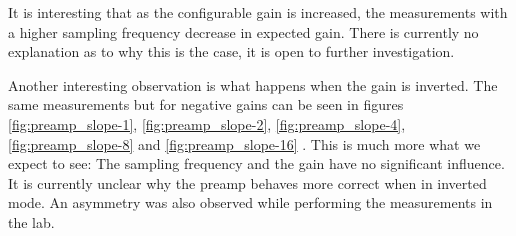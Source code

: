 It is interesting that as the configurable gain is increased, the measurements
with a higher sampling frequency decrease in expected gain. There is currently
no  explanation  as  to  why  this  is  the  case,  it   is  open  to  further
investigation.

Another interesting observation is what happens when the gain is inverted. The
same  measurements  but  for   negative   gains   can   be   seen  in  figures
\ref{fig:preamp_slope-1}, \ref{fig:preamp_slope-2},  \ref{fig:preamp_slope-4},
\ref{fig:preamp_slope-8} and  \ref{fig:preamp_slope-16}  .  This  is much more
what we expect to see: The sampling frequency and the gain have no significant
influence. It is currently unclear why the preamp behaves more correct when in
inverted  mode.   An   asymmetry   was  also  observed  while  performing  the
measurements in the lab.

